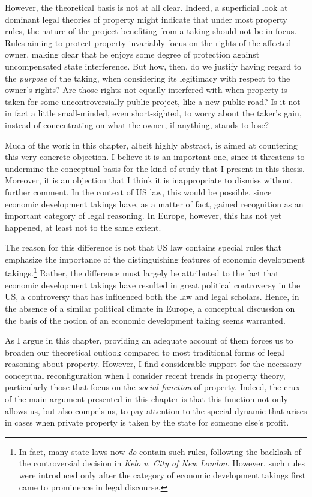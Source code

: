 However, the theoretical basis is not at all clear. Indeed, a superficial look at dominant legal theories of property might indicate that under most property rules, the nature of the project benefiting from a taking should not be in focus. Rules aiming to protect property invariably focus on the rights of the affected owner, making clear that he enjoys some degree of protection against uncompensated state interference. But how, then, do we justify having regard to the {\it purpose} of the taking, when considering its legitimacy with respect to the owner's rights? Are those rights not equally interfered with when  property is taken for some uncontroversially public project, like a new public road? Is it not in fact a little small-minded, even short-sighted, to worry about the taker's gain, instead of concentrating on what the owner, if anything, stands to lose?

Much of the work in this chapter, albeit highly abstract, is aimed at countering this very concrete objection. I believe it is an important one, since it threatens to undermine the conceptual basis for the kind of study that I present in this thesis. Moreover, it is an objection that I think it is inappropriate to dismiss without further comment. In the context of US law, this would be possible, since economic development takings have, as a matter of fact, gained recognition as an important category of legal reasoning. In Europe, however, this has not yet happened, at least not to the same extent.

The reason for this difference is not that US law contains special rules that emphasize the importance of the distinguishing features of economic development takings.\footnote{In fact, many state laws now {\it do} contain such rules, following the backlash of the controversial decision in {\it Kelo v. City of New London}. However, such rules were introduced only after the category of economic development takings first came to prominence in legal discourse.} Rather, the difference must largely be attributed to the fact that economic development takings have resulted in great political controversy in the US, a controversy that has influenced both the law and legal scholars. Hence, in the absence of a similar political climate in Europe, a conceptual discussion on the basis of the notion of an economic development taking seems warranted. 

As I argue in this chapter, providing an adequate account of them forces us to broaden our theoretical outlook compared to most traditional forms of legal reasoning about property. However, I find considerable support for the necessary conceptual reconfiguration when I consider recent trends in property theory, particularly those that focus on the {\it social function} of property.
Indeed, the crux of the main argument presented in this chapter is that this function not only allows us, but also compels us, to pay attention to the special dynamic that arises in cases when private property is taken by the state for someone else's profit.

